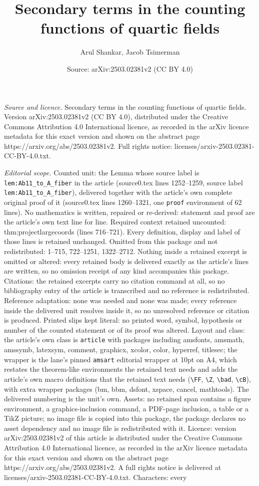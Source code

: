\documentclass[10pt,a4paper]{amsart}
\title[Secondary terms in the counting functions of quartic fields]{Secondary terms in the counting functions of quartic fields}
\author{Arul Shankar, Jacob Tsimerman}
\date{Source: arXiv:2503.02381v2 (CC BY 4.0)}
\begin{document}
\maketitle

\noindent\emph{Source and licence.} Secondary terms in the counting functions of quartic fields. Version arXiv:2503.02381v2 (CC BY 4.0), distributed under the Creative Commons Attribution 4.0 International licence, as recorded in the arXiv licence metadata for this exact version and shown on the abstract page https://arxiv.org/abs/2503.02381v2. Full rights notice: licenses/arxiv-2503.02381-CC-BY-4.0.txt.\par\smallskip

\noindent\textit{Editorial scope.} Counted unit: the Lemma whose source label is \texttt{lem:Ab11\_to\_A\_fiber} in the article (source0.tex lines 1252--1259, source label \texttt{lem:Ab11\_to\_A\_fiber}), delivered together with the article's own complete original proof of it (source0.tex lines 1260--1321, one \texttt{proof} environment of 62 lines). No mathematics is written, repaired or re-derived: statement and proof are the article's own text line for line. Required context retained uncounted: thm:projectlargecoords (lines 716--721). Every definition, display and label of those lines is retained unchanged. Omitted from this package and not redistributed: 1--715, 722--1251, 1322--2712. Nothing inside a retained excerpt is omitted or altered: every retained body is delivered exactly as the article's lines are written, so no omission receipt of any kind accompanies this package. Citations: the retained excerpts carry no citation command at all, so no bibliography entry of the article is transcribed and no reference is redistributed. Reference adaptation: none was needed and none was made; every reference inside the delivered unit resolves inside it, so no unresolved reference or citation is produced. Printed slips kept literal: no printed word, symbol, hypothesis or number of the counted statement or of its proof was altered. Layout and class: the article's own class is \texttt{article} with packages including amsfonts, amsmath, amssymb, latexsym, comment, graphicx, xcolor, color, hyperref, titlesec; the wrapper is the lane's pinned \texttt{amsart} editorial wrapper at 10pt on A4, which restates the theorem-like environments the retained text needs and adds the article's own macro definitions that the retained text needs (\texttt{\textbackslash FF}, \texttt{\textbackslash Z}, \texttt{\textbackslash bad}, \texttt{\textbackslash cB}), with extra wrapper packages (bm, bbm, dsfont, xspace, cancel, mathtools). The delivered numbering is the unit's own. Assets: no retained span contains a figure environment, a graphics-inclusion command, a PDF-page inclusion, a table or a TikZ picture; no image file is copied into this package, the package declares no asset dependency and no image file is redistributed with it. Licence: version arXiv:2503.02381v2 of this article is distributed under the Creative Commons Attribution 4.0 International licence, as recorded in the arXiv licence metadata for this exact version and shown on the abstract page https://arxiv.org/abs/2503.02381v2. A full rights notice is delivered at licenses/arxiv-2503.02381-CC-BY-4.0.txt. Characters: every 
\end{document}
